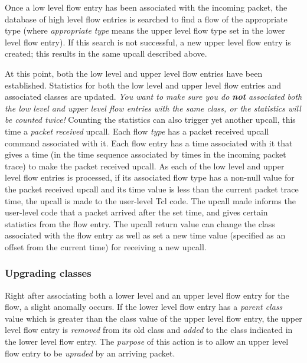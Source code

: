 \documentclass{article}
\begin{document}
Once a low level flow entry has been associated with the incoming
packet, the database of high level flow entries is searched to find a
flow of the appropriate type (where \emph{appropriate type} means the
upper level flow type set in the lower level flow entry).  If this
search is not successful, a new upper level flow entry is created; this
results in the same upcall described above.

At this point, both the low level and upper level flow entries have
been established.  Statistics for both the low level and upper level
flow entries and associated classes are updated.  \emph{You want to
make sure you do \textbf{not} associated both the low level and upper
level flow entries with the same class, or the statistics will be
counted twice!}  Counting the statistics can also trigger yet another
upcall, this time a \emph{packet received} upcall.  Each flow
\emph{type} has a packet received upcall command associated with it.
Each flow entry has a time associated with it that gives a time (in the
time sequence associated by times in the incoming packet trace) to make
the packet received upcall.  As each of the low level and upper level
flow entries is processed, if its associated flow type has a non-null
value for the packet received upcall and its time value is less than
the current packet trace time, the upcall is made to the user-level Tcl
code.  The upcall made informs the user-level code that a packet
arrived after the set time, and gives certain statistics from the flow
entry.  The upcall return value can change the class associated with
the flow entry as well as set a new time value (specified as an offset
from the current time) for receiving a new upcall.

\subsubsection{Upgrading classes}

Right after associating both a lower level and an upper level flow
entry for the flow, a slight anomally occurs.  If the lower level flow
entry has a \emph{parent class} value which is greater than the class
value of the upper level flow entry, the upper level flow entry is
\emph{removed} from its old class and \emph{added} to the class
indicated in the lower level flow entry.  The \emph{purpose} of this
action is to allow an upper level flow entry to be \emph{upraded} by an
arriving packet.
\end{document}
